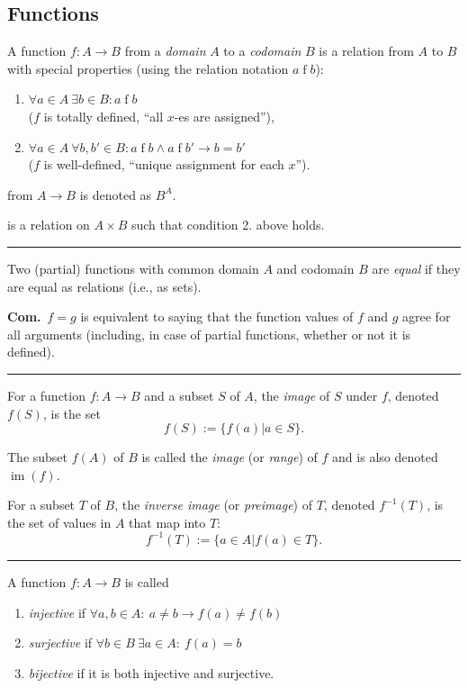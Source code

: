 \documentclass[a4paper]{extarticle}
\newcommand{\Com}{\textbf{Com.}\ }
\newcommand{\relf}{\mathrel{f}}
\DeclareMathOperator{\im}{im}
\newcommand{\sep}{\vspace{5pt}\noindent\hrule\vspace{5pt}}
\begin{document}
\begin{multicols*}{2}
\subsection{Functions}

\Def[Function] A function $f\colon A \to B$ from a \emph{domain} $A$ to a
\emph{codomain} $B$ is a relation from $A$ to $B$ with special properties (using
the relation notation $a \relf b$):
\begin{enumerate}
  \item $\forall a \in A \ \exists b\in B : a\relf b$ \\($f$ is
  totally defined, ``all $x$-es are assigned''),
  \item $\forall a \in A \ \forall b,b' \in B : a \relf b \land a \relf b' \to
  b=b'$ \\ ($f$ is well-defined, ``unique assignment for each $x$'').
\end{enumerate}

 from $A\to B$ is denoted as $B^{A}$.

 is a relation on $A\times B$ such that condition 2. above
holds.

\sep

 Two (partial) functions with common domain $A$ and
codomain $B$ are \emph{equal} if they are equal as relations (i.e., as sets).

\Com $f=g$ is equivalent to saying that the function values of $f$ and $g$ agree
for all arguments (including, in case of partial functions, whether or not it
is defined).

\sep

 For a function $f:A\to B$ and a subset $S$ of $A$, the
\emph{image} of $S$ under $f$, denoted $f(S)$, is the set
\[
f(S):= \{f(a)|a\in S\}.
\]

\Def[Image] The subset $f(A)$ of $B$ is called the \emph{image} (or
\emph{range}) of $f$ and is also denoted $\im (f)$.

 For a subset $T$ of $B$, the \emph{inverse image} (or
\emph{preimage}) of $T$, denoted $f^{-1}(T)$, is the set of values in $A$ that
map into $T$:
\[
f^{-1}(T):=\{a\in A | f(a) \in T\}.
\]

\sep

 A function $f\colon A\to B$ is called
\begin{enumerate}
  \item \emph{injective} if $\forall a,b\in A \colon \ a\neq b \rightarrow
  f(a)\neq f(b)$
  \item \emph{surjective} if $\forall b \in B \ \exists a \in A \colon \ f(a) =
  b$
  \item \emph{bijective} if it is both injective and surjective.
\end{enumerate}


\end{multicols*}
\end{document}
